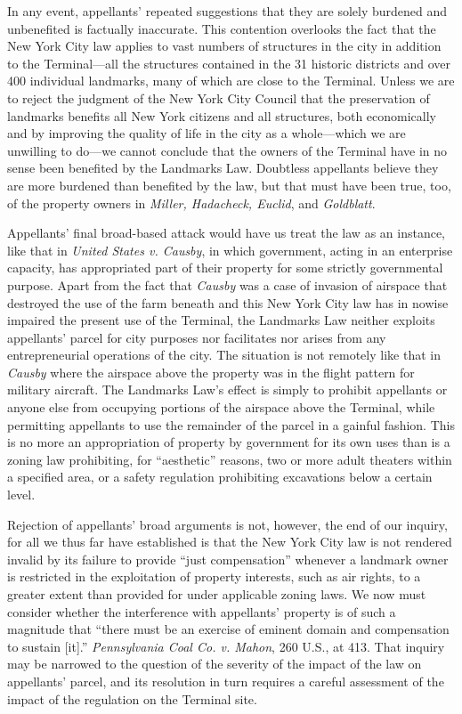 In any event, appellants' repeated suggestions that they are solely burdened and
unbenefited is factually inaccurate. This contention overlooks the fact that the
New York City law applies to vast numbers of structures in the city in addition
to the Terminal---all the structures contained in the 31 historic districts and
over 400 individual landmarks, many of which are close to the Terminal. Unless
we are to reject the judgment of the New York City Council that the preservation
of landmarks benefits all New York citizens and all structures, both
economically and by improving the quality of life in the city as a whole---which
we are unwilling to do---we cannot conclude that the owners of the Terminal have
in no sense been benefited by the Landmarks Law. Doubtless appellants believe
they are more burdened than benefited by the law, but that must have been true,
too, of the property owners in \textit{Miller, Hadacheck, Euclid}, and
\textit{Goldblatt}.

Appellants' final broad-based attack would have us treat the law as an instance,
like that in \textit{United States v. Causby}, in which government, acting in an
enterprise capacity, has appropriated part of their property for some strictly
governmental purpose. Apart from the fact that \textit{Causby} was a case of
invasion of airspace that destroyed the use of the farm beneath and this New
York City law has in nowise impaired the present use of the Terminal, the
Landmarks Law neither exploits appellants' parcel for city purposes nor
facilitates nor arises from any entrepreneurial operations of the city. The
situation is not remotely like that in \textit{Causby} where the airspace above
the property was in the flight pattern for military aircraft. The Landmarks
Law's effect is simply to prohibit appellants or anyone else from occupying
portions of the airspace above the Terminal, while permitting appellants to use
the remainder of the parcel in a gainful fashion. This is no more an
appropriation of property by government for its own uses than is a zoning law
prohibiting, for ``aesthetic'' reasons, two or more adult theaters within a
specified area, or a safety regulation prohibiting excavations below a certain
level. 



Rejection of appellants' broad arguments is not, however, the end of our
inquiry, for all we thus far have established is that the New York City law is
not rendered invalid by its failure to provide ``just compensation'' whenever a
landmark owner is restricted in the exploitation of property interests, such as
air rights, to a greater extent than provided for under applicable zoning laws.
We now must consider whether the interference with appellants' property is of
such a magnitude that ``there must be an exercise of eminent domain and
compensation to sustain [it].'' \textit{Pennsylvania Coal Co. v. Mahon}, 260
U.S., at 413. That inquiry may be narrowed to the question of the severity of
the impact of the law on appellants' parcel, and its resolution in turn requires
a careful assessment of the impact of the regulation on the Terminal site.

